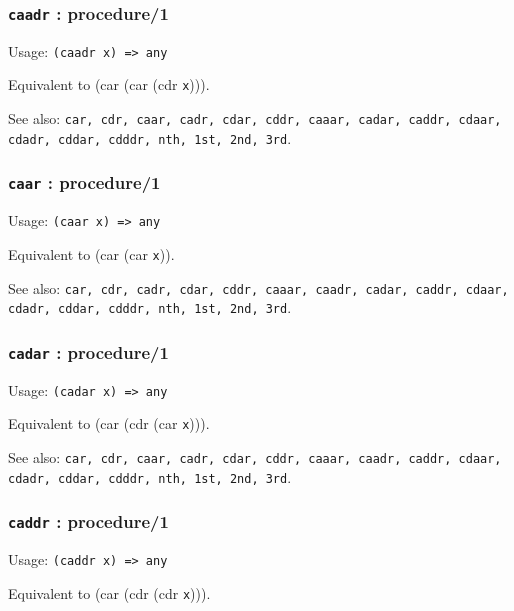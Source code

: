 \documentclass[
]{article}
\newcommand{\passthrough}[1]{#1}
\begin{document}
\hypertarget{caadr-procedure1}{%
\subsubsection{\texorpdfstring{\texttt{caadr} :
procedure/1}{caadr : procedure/1}}\label{caadr-procedure1}}

Usage: \passthrough{\lstinline!(caadr x) => any!}

Equivalent to (car (car (cdr \passthrough{\lstinline!x!}))).

See also:
\passthrough{\lstinline!car, cdr, caar, cadr, cdar, cddr, caaar, cadar, caddr, cdaar, cdadr, cddar, cdddr, nth, 1st, 2nd, 3rd!}.

\hypertarget{caar-procedure1}{%
\subsubsection{\texorpdfstring{\texttt{caar} :
procedure/1}{caar : procedure/1}}\label{caar-procedure1}}

Usage: \passthrough{\lstinline!(caar x) => any!}

Equivalent to (car (car \passthrough{\lstinline!x!})).

See also:
\passthrough{\lstinline!car, cdr, cadr, cdar, cddr, caaar, caadr, cadar, caddr, cdaar, cdadr, cddar, cdddr, nth, 1st, 2nd, 3rd!}.

\hypertarget{cadar-procedure1}{%
\subsubsection{\texorpdfstring{\texttt{cadar} :
procedure/1}{cadar : procedure/1}}\label{cadar-procedure1}}

Usage: \passthrough{\lstinline!(cadar x) => any!}

Equivalent to (car (cdr (car \passthrough{\lstinline!x!}))).

See also:
\passthrough{\lstinline!car, cdr, caar, cadr, cdar, cddr, caaar, caadr, caddr, cdaar, cdadr, cddar, cdddr, nth, 1st, 2nd, 3rd!}.

\hypertarget{caddr-procedure1}{%
\subsubsection{\texorpdfstring{\texttt{caddr} :
procedure/1}{caddr : procedure/1}}\label{caddr-procedure1}}

Usage: \passthrough{\lstinline!(caddr x) => any!}

Equivalent to (car (cdr (cdr \passthrough{\lstinline!x!}))).
\end{document}
